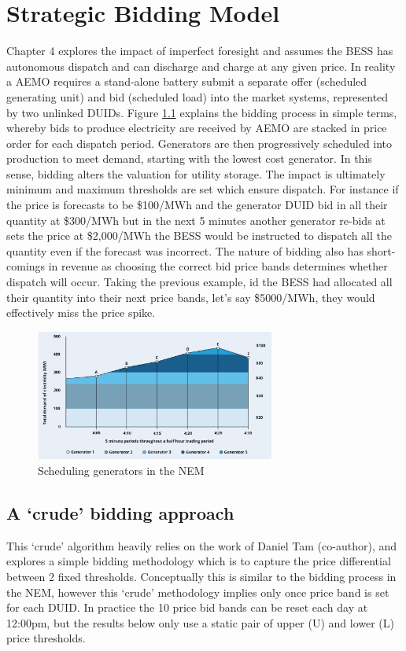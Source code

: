 \chapter{Strategic Bidding Model}
Chapter 4 explores the impact of imperfect foresight and assumes the BESS has autonomous dispatch and can discharge and charge at any given price. In reality a AEMO requires a stand-alone battery submit a separate offer (scheduled generating unit) and bid (scheduled load) into the market systems, represented by two unlinked DUIDs.
Figure \ref{fig:bidding_nem} explains the bidding process in simple terms, whereby bids to produce electricity are received by AEMO are stacked in price order for each dispatch period. Generators are then progressively scheduled into production to meet demand, starting with the lowest cost generator. In this sense, bidding alters the valuation for utility storage. The impact is ultimately minimum and maximum thresholds are set which ensure dispatch. For instance if the price is forecasts to be \$100/MWh and the generator DUID bid in all their quantity at \$300/MWh but in the next 5 minutes another generator re-bids at sets the price at \$2,000/MWh the BESS would be instructed to dispatch all the quantity even if the forecast was incorrect. The nature of bidding also has short-comings in revenue as choosing the correct bid price bands determines whether dispatch will occur. Taking the previous example, id the BESS had allocated all their quantity into their next price bands, let's say \$5000/MWh, they would effectively miss the price spike.
\begin{figure}[H]
    \centering
    \includegraphics[width=0.7\textwidth]{Pictures/Chapter5/bidding.png}
    \caption{Scheduling generators in the NEM \parencite{AEMC_Bidding}}
    \label{fig:bidding_nem}
\end{figure}
\section{ A `crude' bidding approach}
\label{sec:crude}
This `crude' algorithm heavily relies on the work of Daniel Tam (co-author), and explores a simple bidding methodology which is to capture the price differential between 2 fixed thresholds. Conceptually this is similar to the bidding process in the NEM, however this `crude' methodology implies only once price band is set for each DUID. In practice the 10 price bid bands can be reset each day at 12:00pm, but the results below only use a static pair of upper (U) and lower (L) price thresholds.
